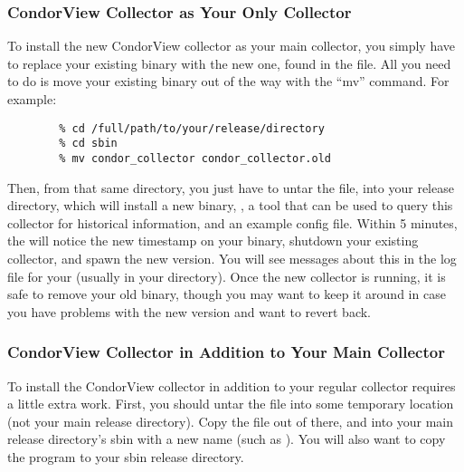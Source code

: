 \subsubsection{\label{sec:CondorView-Server-Only}
CondorView Collector as Your Only Collector} 

To install the new CondorView collector as your main collector, you
simply have to replace your existing binary with the new one, found in
the  file.
All you need to do is move your existing 
binary out of the way with the ``mv'' command.
For example:
\begin{verbatim}
        % cd /full/path/to/your/release/directory
        % cd sbin
        % mv condor_collector condor_collector.old
\end{verbatim}
Then, from that same directory, you just have to untar the
 file, into your release directory, which will
install a new  binary, ,
a tool that can be used to query this collector for historical
information, and an example config file.
Within 5 minutes, the  will notice the new timestamp on
your  binary, shutdown your existing
collector, and spawn the new version.
You will see messages about this in the log file for your
 (usually  in your 
directory).
Once the new collector is running, it is safe to remove your old
binary, though you may want to keep it around in case you have
problems with the new version and want to revert back.

\subsubsection{\label{sec:CondorView-Server-Both}
CondorView Collector in Addition to Your Main Collector} 

To install the CondorView collector in addition to your regular
collector requires a little extra work.
First, you should untar the  file into some
temporary location (not your main release directory).
Copy the  file out of there, and into
your main release directory's sbin with a new name (such as
).
You will also want to copy the  program to your
sbin release directory. 


